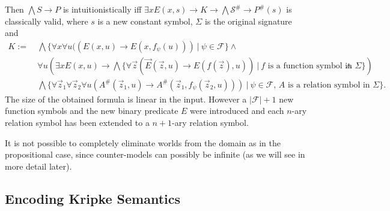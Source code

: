 \documentclass[a4paper,UKenglish,cleveref, autoref, thm-restate]{lipics-v2021}
\begin{document}
\begin{theorem}
\begin{itemize}
	\end{itemize}
	Then $\bigwedge S\to P$ is intuitionistically iff $\exists xE(x, s)\to K\to \bigwedge\mathcal S^\#\to P^\#(s)$ is classically valid, where $s$ is a new constant symbol, $\Sigma$ is the original signature and
	\begin{align*}
		K := &\:\bigwedge\{\forall x\forall u((E(x, u)\to E(x, f_\psi(u)))\:|\:\psi\in\mathcal F\}\wedge\\
		&\:\forall u\left(\exists xE(x, u)\to \bigwedge\{\forall\vec z(\vec E(\vec z, u)\to E(f(\vec z), u))\:|\:\text{$f$ is a function symbol in $\Sigma$}\}\right)\wedge\\
		&\:\bigwedge\{\forall\vec z_1\forall \vec z_2\forall u(A^\#(\vec z_1, u)\to A^\#(\vec z_1, f_\psi(\vec z_2, u)))\:|\:\text{$\psi\in\mathcal F$, $A$ is a relation symbol in $\Sigma$}\}.
	\end{align*}
	The size of the obtained formula is linear in the input. However a $|\mathcal F| + 1$ new function symbols and the new binary predicate $E$ were introduced and each $n$-ary relation symbol has been extended to a $n+1$-ary relation symbol.
\end{theorem}

It is not possible to completely eliminate worlds from the domain as in the propositional case, since counter-models can possibly be infinite (as we will see in more detail later).

\subsection{Encoding Kripke Semantics}
\end{document}
